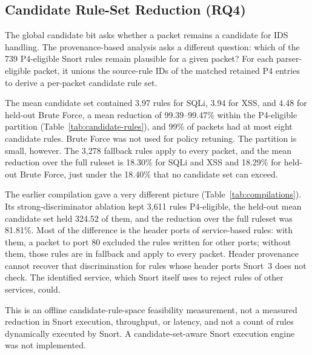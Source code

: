\documentclass{article}
\begin{document}
\subsection{Candidate Rule-Set Reduction (RQ4)}
\label{sec:candidate-sets}
The global candidate bit asks whether a packet remains a candidate for IDS
handling. The provenance-based analysis asks a different question: which of
the 739 P4-eligible Snort rules remain plausible for a given packet? For
each parser-eligible packet, it unions the source-rule IDs of the matched
retained P4 entries to derive a per-packet candidate rule set.

The mean candidate set contained 3.97 rules for SQLi, 3.94 for XSS, and 4.48
for held-out Brute Force, a mean reduction of 99.39--99.47\% within the
P4-eligible partition (Table~\ref{tab:candidate-rules}), and 99\% of packets
had at most eight candidate rules. Brute Force was not used for policy
retuning. The partition is small, however. The 3,278 fallback rules apply to
every packet, and the mean reduction over the full ruleset is 18.30\% for
SQLi and XSS and 18.29\% for held-out Brute Force, just under the 18.40\%
that no candidate set can exceed.

The earlier compilation gave a very different picture
(Table~\ref{tab:compilations}). Its strong-discriminator ablation kept 3,611
rules P4-eligible, the held-out mean candidate set held 324.52 of them, and
the reduction over the full ruleset was 81.81\%. Most of the difference is
the header ports of service-based rules: with them, a packet to port 80
excluded the rules written for other ports; without them, those rules are in
fallback and apply to every packet. Header provenance cannot recover that
discrimination for rules whose header ports Snort~3 does not check. The
identified service, which Snort itself uses to reject rules of other
services, could.

This is an offline candidate-rule-space feasibility measurement, not a
measured reduction in Snort execution, throughput, or latency, and not a
count of rules dynamically executed by Snort. A candidate-set-aware Snort
execution engine was not implemented.
\end{document}
